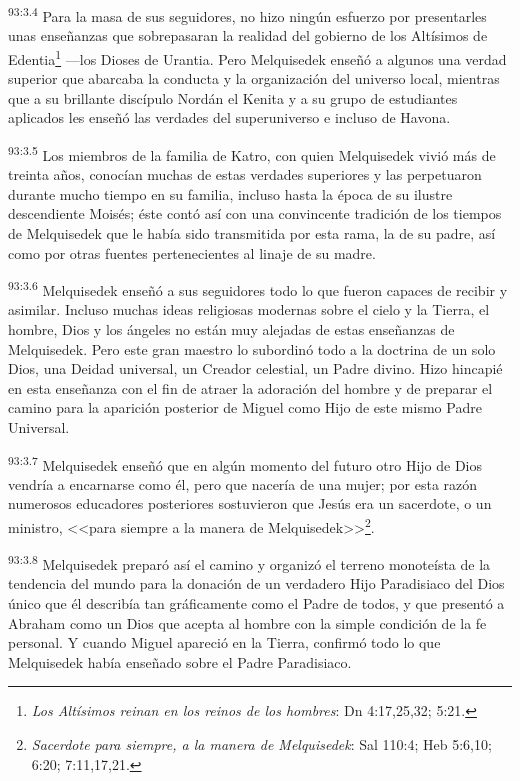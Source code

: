 \par
\textsuperscript{93:3.4} Para la masa de sus seguidores, no hizo ningún esfuerzo por presentarles unas enseñanzas que sobrepasaran la realidad del gobierno de los Altísimos de Edentia\footnote{\textit{Los Altísimos reinan en los reinos de los hombres}: Dn 4:17,25,32; 5:21.} ---los Dioses de Urantia. Pero Melquisedek enseñó a algunos una verdad superior que abarcaba la conducta y la organización del universo local, mientras que a su brillante discípulo Nordán el Kenita y a su grupo de estudiantes aplicados les enseñó las verdades del superuniverso e incluso de Havona.

\par
\textsuperscript{93:3.5} Los miembros de la familia de Katro, con quien Melquisedek vivió más de treinta años, conocían muchas de estas verdades superiores y las perpetuaron durante mucho tiempo en su familia, incluso hasta la época de su ilustre descendiente Moisés; éste contó así con una convincente tradición de los tiempos de Melquisedek que le había sido transmitida por esta rama, la de su padre, así como por otras fuentes pertenecientes al linaje de su madre.

\par
\textsuperscript{93:3.6} Melquisedek enseñó a sus seguidores todo lo que fueron capaces de recibir y asimilar. Incluso muchas ideas religiosas modernas sobre el cielo y la Tierra, el hombre, Dios y los ángeles no están muy alejadas de estas enseñanzas de Melquisedek. Pero este gran maestro lo subordinó todo a la doctrina de un solo Dios, una Deidad universal, un Creador celestial, un Padre divino. Hizo hincapié en esta enseñanza con el fin de atraer la adoración del hombre y de preparar el camino para la aparición posterior de Miguel como Hijo de este mismo Padre Universal.

\par
\textsuperscript{93:3.7} Melquisedek enseñó que en algún momento del futuro otro Hijo de Dios vendría a encarnarse como él, pero que nacería de una mujer; por esta razón numerosos educadores posteriores sostuvieron que Jesús era un sacerdote, o un ministro, <<para siempre a la manera de Melquisedek>>\footnote{\textit{Sacerdote para siempre, a la manera de Melquisedek}: Sal 110:4; Heb 5:6,10; 6:20; 7:11,17,21.}.

\par
\textsuperscript{93:3.8} Melquisedek preparó así el camino y organizó el terreno monoteísta de la tendencia del mundo para la donación de un verdadero Hijo Paradisiaco del Dios único que él describía tan gráficamente como el Padre de todos, y que presentó a Abraham como un Dios que acepta al hombre con la simple condición de la fe personal. Y cuando Miguel apareció en la Tierra, confirmó todo lo que Melquisedek había enseñado sobre el Padre Paradisiaco.

